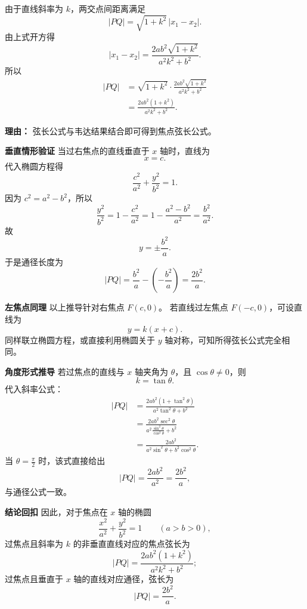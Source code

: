 \begin{proofbox}
\begin{description}[style=nextline, leftmargin=2.8em, labelsep=0.5em, itemsep=0.55em]
		\item[\textbf{步骤五（使用弦长公式）：}]
		      由于直线斜率为 $k$，两交点间距离满足
		      \[
			      |PQ|=\sqrt{1+k^2}\,|x_1-x_2|.
		      \]
		      由上式开方得
		      \[
			      |x_1-x_2|
			      =
			      \frac{2ab^2\sqrt{1+k^2}}{a^2k^2+b^2}.
		      \]
		      所以
		      \[
			      \begin{aligned}
				      |PQ|
				       & =\sqrt{1+k^2}\cdot
				      \frac{2ab^2\sqrt{1+k^2}}{a^2k^2+b^2} \\[0.3em]
				       & =\frac{2ab^2(1+k^2)}{a^2k^2+b^2}.
			      \end{aligned}
		      \]
		      \par\textbf{理由：}
		      弦长公式与韦达结果结合即可得到焦点弦长公式。
	\end{description}

	\medskip

	\textbf{\textcolor{CProof}{垂直情形验证}}
	当过右焦点的直线垂直于 $x$ 轴时，直线为
	\[
		x=c.
	\]
	代入椭圆方程得
	\[
		\frac{c^2}{a^2}+\frac{y^2}{b^2}=1.
	\]
	因为 $c^2=a^2-b^2$，所以
	\[
		\frac{y^2}{b^2}=1-\frac{c^2}{a^2}
		=1-\frac{a^2-b^2}{a^2}
		=\frac{b^2}{a^2}.
	\]
	故
	\[
		y=\pm\frac{b^2}{a}.
	\]
	于是通径长度为
	\[
		|PQ|=\frac{b^2}{a}-\left(-\frac{b^2}{a}\right)
		=\frac{2b^2}{a}.
	\]

	\medskip

	\textbf{\textcolor{CProof}{左焦点同理}}
	以上推导针对右焦点 $F(c,0)$。
	若直线过左焦点 $F(-c,0)$，可设直线为
	\[
		y=k(x+c).
	\]
	同样联立椭圆方程，或直接利用椭圆关于 $y$ 轴对称，可知所得弦长公式完全相同。

	\medskip

	\textbf{\textcolor{CProof}{角度形式推导}}
	若过焦点的直线与 $x$ 轴夹角为 $\theta$，且 $\cos\theta\ne0$，则
	\[
		k=\tan\theta.
	\]
	代入斜率公式：
	\[
		\begin{aligned}
			|PQ|
			 & =\frac{2ab^2(1+\tan^2\theta)}{a^2\tan^2\theta+b^2} \\[0.3em]
			 & =\frac{2ab^2\sec^2\theta}
			{a^2\frac{\sin^2\theta}{\cos^2\theta}+b^2}            \\[0.3em]
			 & =\frac{2ab^2}{a^2\sin^2\theta+b^2\cos^2\theta}.
		\end{aligned}
	\]
	当 $\theta=\frac{\pi}{2}$ 时，该式直接给出
	\[
		|PQ|=\frac{2ab^2}{a^2}=\frac{2b^2}{a},
	\]
	与通径公式一致。

	\medskip

	\textbf{\textcolor{CProof}{结论回扣}}
	因此，对于焦点在 $x$ 轴的椭圆
	\[
		\frac{x^2}{a^2}+\frac{y^2}{b^2}=1\qquad (a>b>0),
	\]
	过焦点且斜率为 $k$ 的非垂直直线对应的焦点弦长为
	\[
		|PQ|=\frac{2ab^2(1+k^2)}{a^2k^2+b^2};
	\]
	过焦点且垂直于 $x$ 轴的直线对应通径，弦长为
	\[
		|PQ|=\frac{2b^2}{a}.
	\]
\end{proofbox}

